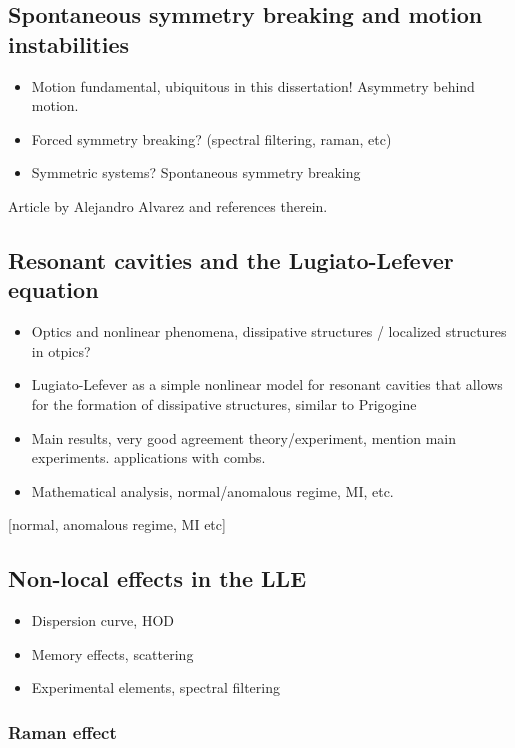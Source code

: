 \subsection{Spontaneous symmetry breaking and motion instabilities}

\begin{itemize}
    \item Motion fundamental, ubiquitous in this dissertation! Asymmetry behind motion.
    \item Forced symmetry breaking? (spectral filtering, raman, etc)
    \item Symmetric systems? Spontaneous symmetry breaking
\end{itemize}

Article by Alejandro Alvarez and references therein.


\subsection{Resonant cavities and the Lugiato-Lefever equation}

\begin{itemize}
    \item Optics and nonlinear phenomena, dissipative structures / localized structures in otpics?
    \item Lugiato-Lefever as a simple nonlinear model for resonant cavities that allows for the
    formation of dissipative structures, similar to Prigogine
    \item Main results, very good agreement theory/experiment, mention main experiments.
    applications with combs.
    \item Mathematical analysis, normal/anomalous regime, MI, etc.
\end{itemize}

[normal, anomalous regime, MI etc]

\subsection{Non-local effects in the LLE}

\begin{itemize}
    \item Dispersion curve, HOD
    \item Memory effects, scattering
    \item Experimental elements, spectral filtering
\end{itemize}

\subsubsection{Raman effect}
